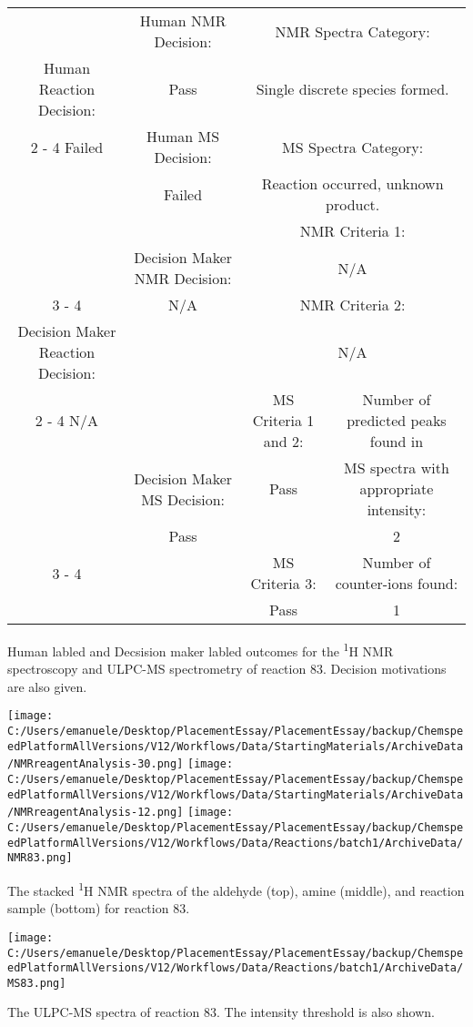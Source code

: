 \documentclass{article}%
\begin{document}
\begin{Decision Table}[H]%
\begin{tabular}{|c|c|c|c|}%
\hline%
&Human NMR Decision:&\multicolumn{2}{|c|}{NMR Spectra Category:}\\%
Human Reaction Decision:&Pass&\multicolumn{2}{|c|}{Single discrete species formed.}\\%
\cline{2%
-%
4}%
Failed&Human MS Decision:&\multicolumn{2}{|c|}{MS Spectra Category:}\\%
&Failed&\multicolumn{2}{|c|}{Reaction occurred, unknown product.}\\%
\hline%
&&\multicolumn{2}{|c|}{NMR Criteria 1:}\\%
&Decision Maker NMR Decision:&\multicolumn{2}{|c|}{N/A}\\%
\cline{3%
-%
4}%
&N/A&\multicolumn{2}{|c|}{NMR Criteria 2:}\\%
Decision Maker Reaction Decision:&&\multicolumn{2}{|c|}{N/A}\\%
\cline{2%
-%
4}%
N/A&&MS Criteria 1 and 2:&Number of predicted peaks found in\\%
&Decision Maker MS Decision:&Pass&MS spectra with appropriate intensity:\\%
&Pass&&2\\%
\cline{3%
-%
4}%
&&MS Criteria 3:&Number of counter{-}ions found:\\%
&&Pass&1\\%
\hline%
\end{tabular}%
\caption{Human labled and Decsision maker labled outcomes for the \textsuperscript{1}H NMR spectroscopy and ULPC-MS spectrometry of reaction 83. Decision motivations are also given.}%
\end{Decision Table}%
\begin{NMR Spectra}[H]%
\begin{center}%
\texttt{[image: C:/Users/emanuele/Desktop/PlacementEssay/PlacementEssay/backup/ChemspeedPlatformAllVersions/V12/Workflows/Data/StartingMaterials/ArchiveData/NMRreagentAnalysis-30.png]}\hfill%
\texttt{[image: C:/Users/emanuele/Desktop/PlacementEssay/PlacementEssay/backup/ChemspeedPlatformAllVersions/V12/Workflows/Data/StartingMaterials/ArchiveData/NMRreagentAnalysis-12.png]}\hfill%
\texttt{[image: C:/Users/emanuele/Desktop/PlacementEssay/PlacementEssay/backup/ChemspeedPlatformAllVersions/V12/Workflows/Data/Reactions/batch1/ArchiveData/NMR83.png]}\hfill%
\end{center}%
\caption{The stacked \textsuperscript{1}H NMR spectra of the aldehyde (top), amine (middle), and reaction sample (bottom) for reaction 83.}%
\end{NMR Spectra}%
\begin{MS Spectra}[H]%
\begin{center}%
\texttt{[image: C:/Users/emanuele/Desktop/PlacementEssay/PlacementEssay/backup/ChemspeedPlatformAllVersions/V12/Workflows/Data/Reactions/batch1/ArchiveData/MS83.png]}\hfill%
\end{center}%
\caption{The ULPC-MS spectra of reaction 83. The intensity threshold is also shown.}%
\end{MS Spectra}%
\end{document}
